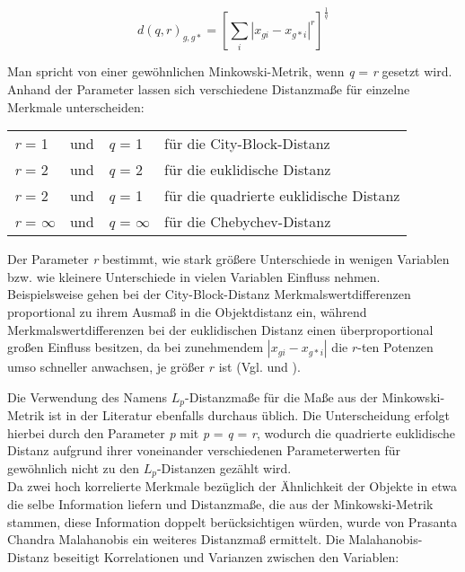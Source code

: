 \begin{equation}
d(q,r)_{g,g*} = 
\left[	\sum_{i} |x_{gi} - x_{g*i}|^r	\right]^\frac{1}{q}
\end{equation}

Man spricht von einer gewöhnlichen Minkowski-Metrik, wenn \textit{q} = \textit{r} gesetzt wird. Anhand der Parameter lassen sich verschiedene Distanzmaße für einzelne Merkmale unterscheiden:
\begin{center}
\begin{tabular}{lcll}
	\textit{r} = 1 & und & \textit{q} = 1 & für die City-Block-Distanz \\
	\textit{r} = 2 & und & \textit{q} = 2 & für die euklidische Distanz \\
	\textit{r} = 2 & und & \textit{q} = 1 & für die quadrierte euklidische Distanz \\
	\textit{r} = $\infty$ & und & \textit{q} = $\infty$ & für die Chebychev-Distanz \\
\end{tabular}
\end{center}

Der Parameter \textit{r} bestimmt, wie stark größere Unterschiede in wenigen Variablen bzw. wie kleinere Unterschiede in vielen Variablen Einfluss nehmen. Beispielsweise gehen bei der City-Block-Distanz Merkmalswertdifferenzen proportional zu ihrem Ausmaß in die Objektdistanz ein, während Merkmalswertdifferenzen bei der euklidischen Distanz einen überproportional großen Einfluss besitzen, da bei zunehmendem $|x_{gi} - x_{g*i}|$ die $r$-ten Potenzen umso schneller anwachsen, je größer $r$ ist (Vgl. \citealt[S. 212]{Eckey.2002} und \citealt[S. 40]{Bock.1974}). 

Die Verwendung des Namens $L_p$-Distanzmaße für die Maße aus der Minkowski-Metrik ist in der Literatur ebenfalls durchaus üblich. Die Unterscheidung erfolgt hierbei durch den Parameter \textit{p} mit \textit{p} = \textit{q} = \textit{r}, wodurch die quadrierte euklidische Distanz aufgrund ihrer voneinander verschiedenen Parameterwerten für gewöhnlich nicht zu den $L_p$-Distanzen gezählt wird. \\

Da zwei hoch korrelierte Merkmale bezüglich der Ähnlichkeit der Objekte in etwa die selbe Information liefern und Distanzmaße, die aus der Minkowski-Metrik stammen, diese Information doppelt berücksichtigen würden, wurde von Prasanta Chandra Malahanobis ein weiteres Distanzmaß ermittelt. Die Malahanobis-Distanz beseitigt Korrelationen und Varianzen zwischen den Variablen:


